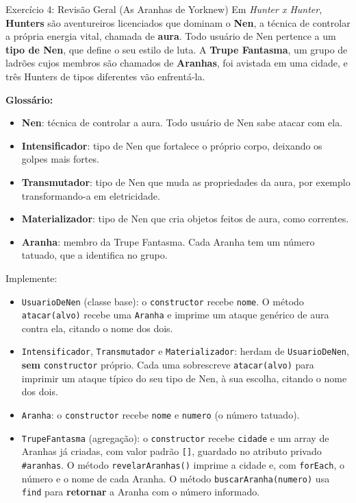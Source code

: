 \begin{exercicio}{Exercício 4: Revisão Geral (As Aranhas de Yorknew)}
Em \textit{Hunter x Hunter}, \textbf{Hunters} são aventureiros licenciados que dominam o
\textbf{Nen}, a técnica de controlar a própria energia vital, chamada de \textbf{aura}. Todo
usuário de Nen pertence a um \textbf{tipo de Nen}, que define o seu estilo de luta. A
\textbf{Trupe Fantasma}, um grupo de ladrões cujos membros são chamados de \textbf{Aranhas}, foi
avistada em uma cidade, e três Hunters de tipos diferentes vão enfrentá-la.

\textbf{Glossário:}
\begin{itemize}
    \item \textbf{Nen}: técnica de controlar a aura. Todo usuário de Nen sabe atacar com ela.
    \item \textbf{Intensificador}: tipo de Nen que fortalece o próprio corpo, deixando os golpes
    mais fortes.
    \item \textbf{Transmutador}: tipo de Nen que muda as propriedades da aura, por exemplo
    transformando-a em eletricidade.
    \item \textbf{Materializador}: tipo de Nen que cria objetos feitos de aura, como correntes.
    \item \textbf{Aranha}: membro da Trupe Fantasma. Cada Aranha tem um número tatuado, que a
    identifica no grupo.
\end{itemize}

Implemente:

\begin{itemize}
    \item \texttt{UsuarioDeNen} (classe base): o \texttt{constructor} recebe \texttt{nome}. O
    método \texttt{atacar(alvo)} recebe uma \texttt{Aranha} e imprime um ataque genérico de aura
    contra ela, citando o nome dos dois.

    \item \texttt{Intensificador}, \texttt{Transmutador} e \texttt{Materializador}: herdam de
    \texttt{UsuarioDeNen}, \textbf{sem} \texttt{constructor} próprio. Cada uma sobrescreve
    \texttt{atacar(alvo)} para imprimir um ataque típico do seu tipo de Nen, à sua escolha,
    citando o nome dos dois.

    \item \texttt{Aranha}: o \texttt{constructor} recebe \texttt{nome} e \texttt{numero} (o
    número tatuado).

    \item \texttt{TrupeFantasma} (agregação): o \texttt{constructor} recebe \texttt{cidade} e um
    array de Aranhas já criadas, com valor padrão \texttt{[]}, guardado no atributo privado
    \texttt{\#aranhas}. O método \texttt{revelarAranhas()} imprime a cidade e, com
    \texttt{forEach}, o número e o nome de cada Aranha. O método \texttt{buscarAranha(numero)}
    usa \texttt{find} para \textbf{retornar} a Aranha com o número informado.
\end{itemize}


\end{exercicio}
